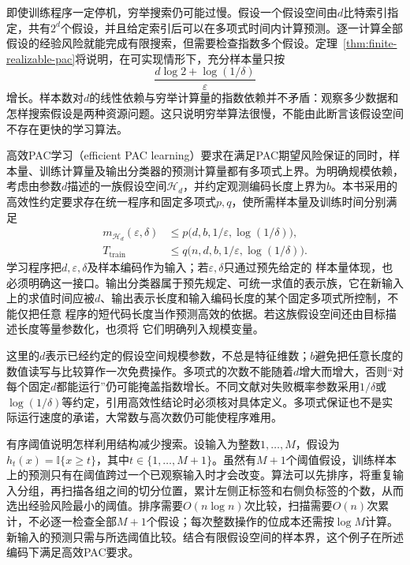 即使训练程序一定停机，穷举搜索仍可能过慢。假设一个假设空间由$d$比特索引指定，共有$2^d$个假设，并且给定索引后可以在多项式时间内计算预测。逐一计算全部假设的经验风险就能完成有限搜索，但需要检查指数多个假设。定理~\ref{thm:finite-realizable-pac}将说明，在可实现情形下，充分样本量只按
\[
 \frac{d\log2+\log(1/\delta)}{\varepsilon}
\]
增长。样本数对$d$的线性依赖与穷举计算量的指数依赖并不矛盾：观察多少数据和怎样搜索假设是两种资源问题。这只说明穷举算法很慢，不能由此断言该假设空间不存在更快的学习算法。

\begin{definition}[高效PAC学习]
\label{def:efficient-pac-learning}
高效PAC学习（efficient PAC learning）要求在满足PAC期望风险保证的同时，样本量、训练计算量及输出分类器的预测计算量都有多项式上界。为明确规模依赖，考虑由参数$d$描述的一族假设空间$\mathcal H_d$，并约定观测编码长度上界为$b$。本书采用的高效性约定要求存在统一程序和固定多项式$p,q$，使所需样本量及训练时间分别满足
\begin{equation}
 \begin{aligned}
 m_{\mathcal H_d}(\varepsilon,\delta)
 &\leq p\bigl(d,b,1/\varepsilon,\log(1/\delta)\bigr),\\
 T_{\mathrm{train}}
 &\leq q\bigl(n,d,b,1/\varepsilon,\log(1/\delta)\bigr).
 \end{aligned}
 \label{eq:efficient-pac-resources}
\end{equation}
学习程序把$d,\varepsilon,\delta$及样本编码作为输入；若$\varepsilon,\delta$只通过预先给定的
样本量体现，也必须明确这一接口。输出分类器属于预先规定、可统一求值的表示族，它在新输入
上的求值时间应被$d$、输出表示长度和输入编码长度的某个固定多项式所控制，不能仅把任意
程序的短代码长度当作预测高效的依据。若这族假设空间还由目标描述长度等量参数化，也须将
它们明确列入规模变量。
\end{definition}

这里的$d$表示已经约定的假设空间规模参数，不总是特征维数；$b$避免把任意长度的数值读写与比较算作一次免费操作。多项式的次数不能随着$d$增大而增大，否则“对每个固定$d$都能运行”仍可能掩盖指数增长。不同文献对失败概率参数采用$1/\delta$或$\log(1/\delta)$等约定，引用高效性结论时必须核对具体定义。多项式保证也不是实际运行速度的承诺，大常数与高次数仍可能使程序难用。

有序阈值说明怎样利用结构减少搜索。设输入为整数$1,\ldots,M$，假设为$h_t(x)=\mathbb I\{x\geq t\}$，其中$t\in\{1,\ldots,M+1\}$。虽然有$M+1$个阈值假设，训练样本上的预测只有在阈值跨过一个已观察输入时才会改变。算法可以先排序，将重复输入分组，再扫描各组之间的切分位置，累计左侧正标签和右侧负标签的个数，从而选出经验风险最小的阈值。排序需要$O(n\log n)$次比较，扫描需要$O(n)$次累计，不必逐一检查全部$M+1$个假设；每次整数操作的位成本还需按$\log M$计算。新输入的预测只需与所选阈值比较。结合有限假设空间的样本界，这个例子在所述编码下满足高效PAC要求。

